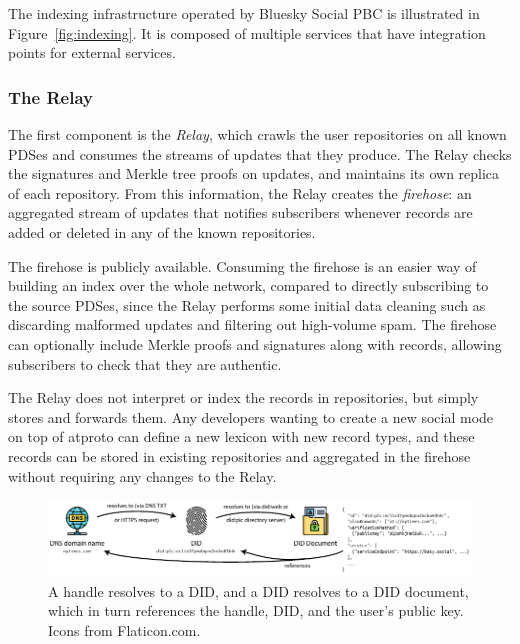 \documentclass[sigconf,nonacm]{acmart}
\begin{document}
The indexing infrastructure operated by Bluesky Social PBC is illustrated in Figure~\ref{fig:indexing}.
It is composed of multiple services that have integration points for external services.

\subsubsection{The Relay}\label{sec:relay}

The first component is the \emph{Relay}, which crawls the user repositories on all known PDSes and consumes the streams of updates that they produce.
The Relay checks the signatures and Merkle tree proofs on updates, and maintains its own replica of each repository.
From this information, the Relay creates the \emph{firehose}: an aggregated stream of updates that notifies subscribers whenever records are added or deleted in any of the known repositories.

The firehose is publicly available.
Consuming the firehose is an easier way of building an index over the whole network, compared to directly subscribing to the source PDSes, since the Relay performs some initial data cleaning such as discarding malformed updates and filtering out high-volume spam.
The firehose can optionally include Merkle proofs and signatures along with records, allowing subscribers to check that they are authentic.

The Relay does not interpret or index the records in repositories, but simply stores and forwards them.
Any developers wanting to create a new social mode on top of atproto can define a new lexicon with new record types, and these records can be stored in existing repositories and aggregated in the firehose without requiring any changes to the Relay.

\begin{figure}
    \centering
    \includegraphics[width=\linewidth]{identity.pdf}
    \caption{A handle resolves to a DID, and a DID resolves to a DID document, which in turn references the handle, DID, and the user's public key. Icons from Flaticon.com.}
    \label{fig:identity}
\end{figure}
\end{document}
